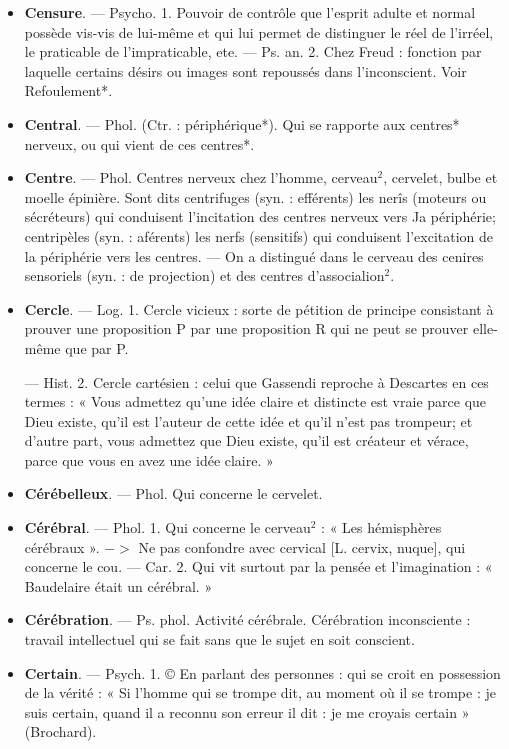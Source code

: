 \begin{itemize}[leftmargin=1cm, label=, itemsep=11pt]
\item {\bf Censure}. — Psycho. 1. Pouvoir de
contrôle que l'esprit adulte et normal possède vis-vis de lui-même
et qui lui permet de distinguer le
réel de l’irréel, le praticable de l’impraticable, ete. — Ps. an. 2. Chez
Freud : fonction par laquelle certains désirs ou images sont repoussés
dans l'inconscient. Voir Refoulement*.

\item {\bf Central}. — Phol. (Ctr. : périphérique*).
Qui se rapporte aux centres* nerveux, ou qui vient de ces centres*.

\item {\bf Centre}. — Phol. Centres nerveux
chez l’homme, cerveau$^2$, cervelet,
bulbe et moelle épinière. Sont dits
centrifuges (syn. : efférents) les nerîs
(moteurs ou sécréteurs) qui conduisent l'incitation des centres nerveux
vers Ja périphérie; centripèles (syn. :
aférents) les nerfs (sensitifs) qui
conduisent l'excitation de la périphérie vers les centres. — On a distingué dans le cerveau des cenires
sensoriels (syn. : de projection) et des
centres d'associalion$^2$.

\item {\bf Cercle}. — Log. 1. Cercle vicieux : sorte
de pétition de principe consistant
à prouver une proposition P par
une proposition R qui ne peut se
prouver elle-même que par P.

— Hist. 2. Cercle cartésien : celui
que Gassendi reproche à Descartes
en ces termes : « Vous admettez
qu’une idée claire et distincte est
vraie parce que Dieu existe, qu'il
est l’auteur de cette idée et qu'il
n'est pas trompeur; et d'autre part,
vous admettez que Dieu existe, qu'il
est créateur et vérace, parce que
vous en avez une idée claire. »

\item {\bf Cérébelleux}. — Phol. Qui concerne
le cervelet.

\item {\bf Cérébral}. — Phol. 1. Qui concerne le
cerveau$^2$ : « Les hémisphères cérébraux ». $->$ Ne pas confondre avec
cervical [L. cervix, nuque], qui concerne le cou. — Car. 2. Qui vit surtout par la pensée et l'imagination :
« Baudelaire était un cérébral. »

\item {\bf Cérébration}. — Ps. phol. Activité
cérébrale. Cérébration inconsciente :
travail intellectuel qui se fait sans
que le sujet en soit conscient.

\item {\bf Certain}. — Psych. 1. © En parlant des
personnes : qui se croit en possession de la vérité : « Si l'homme qui se
trompe dit, au moment où il se
trompe : je suis certain, quand il a
reconnu son erreur il dit : je me
croyais certain » (Brochard).


\end{itemize}
